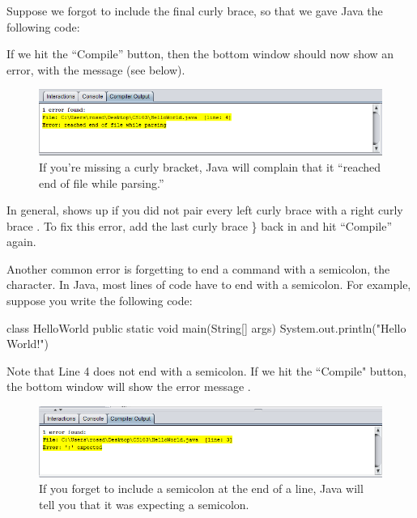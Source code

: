 Suppose we forgot to include the final curly brace, so that we gave Java the following code:
\begin{code}
class HelloWorld {
    public static void main(String[] args) {
        System.out.println("Hello World!");
    }
\end{code}
If we hit the  ``Compile'' button, then the bottom window should now show an error, with the message  (see below).
\begin{figure}
	\centering
	\includegraphics[width=\textwidth]{images/drjava_hello_world_error1.png}
	\caption{If you're missing a curly bracket, Java will complain that it ``reached end of file while parsing.''}
	\label{fig:helloworld:sec:error}
\end{figure}
In general,  shows up if you did not pair every left curly brace \ic{\{} with a right curly brace \ic{\}}. To fix this error, add the last curly brace \} back in and hit ``Compile'' again.

Another common error is forgetting to end a command with a semicolon, the \ic{;} character. In Java, most lines of code have to end with a semicolon. For example, suppose you write the following code:
\begin{code}
class HelloWorld {
    public static void main(String[] args) {
        System.out.println("Hello World!")
    }
}
\end{code}
Note that Line 4 does not end with a semicolon. If we hit the ``Compile" button, the bottom window will show the error message .
\begin{figure}
	\centering
	\includegraphics[width=\textwidth]{images/drjava_hello_world_error2.png}
	\caption{If you forget to include a semicolon at the end of a line, Java will tell you that it was expecting a semicolon.}
	\label{fig:helloworld:sec:error2}
\end{figure}


